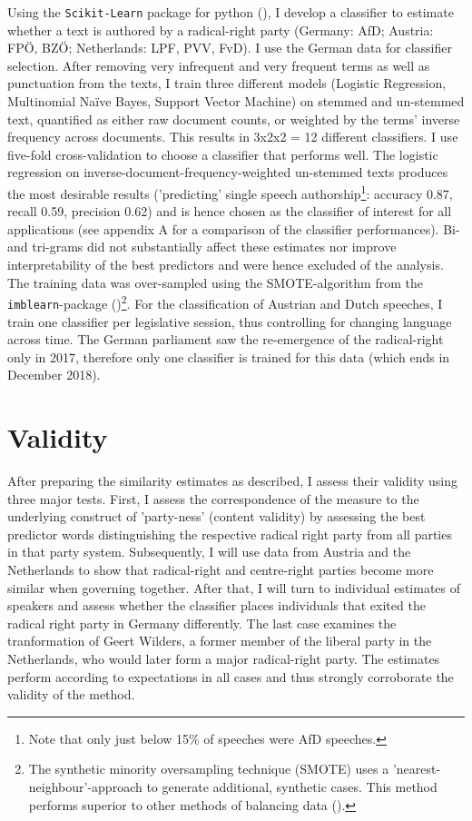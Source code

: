 \documentclass{article}
\begin{document}
Using the \texttt{Scikit-Learn} package for python (\cite{Pedregosa2011}), I develop a classifier to estimate whether a text is authored by a radical-right party (Germany: AfD; Austria: FPÖ, BZÖ; Netherlands: LPF, PVV, FvD). I use the German data for classifier selection. After removing very infrequent and very frequent terms as well as punctuation from the texts, I train three different models (Logistic Regression, Multinomial Naïve Bayes, Support Vector Machine) on stemmed and un-stemmed text, quantified as either raw document counts, or weighted by the terms' inverse frequency across documents. This results in 3x2x2 = 12 different classifiers. I use five-fold cross-validation to choose a classifier that performs well. The logistic regression on inverse-document-frequency-weighted un-stemmed texts produces the most desirable results ('predicting' single speech authorship\footnote{Note that only just below 15\% of speeches were AfD speeches.}: accuracy 0.87, recall 0.59, precision 0.62) and is hence chosen as the classifier of interest for all applications (see appendix A for a comparison of the classifier performances). Bi- and tri-grams did not substantially affect these estimates nor improve interpretability of the best predictors and were hence excluded of the analysis. The training data was over-sampled using the SMOTE-algorithm from the \texttt{imblearn}-package (\cite{Lemaitre2017})\footnote{The synthetic minority oversampling technique (SMOTE) uses a 'nearest-neighbour'-approach to generate additional, synthetic cases. This method performs superior to other methods of balancing data (\cite{Chawla2002}).}. For the classification of Austrian and Dutch speeches, I train one classifier per legislative session, thus controlling for changing language across time. The German parliament saw the re-emergence of the radical-right only in 2017, therefore only one classifier is trained for this data (which ends in December 2018). \par


\section{Validity}
After preparing the similarity estimates as described, I assess their validity using three major tests. First, I assess the correspondence of the measure to the underlying construct of 'party-ness' (content validity) by assessing the best predictor words distinguishing the respective radical right party from all parties in that party system. Subsequently, I will use data from Austria and the Netherlands to show that radical-right and centre-right parties become more similar when governing together. After that, I will turn to individual estimates of speakers and assess whether the classifier places individuals that exited the radical right party in Germany differently. The last case examines the tranformation of Geert Wilders, a former member of the liberal party in the Netherlands, who would later form a major radical-right party. The estimates perform according to expectations in all cases and thus strongly corroborate the validity of the method.\par
\end{document}
